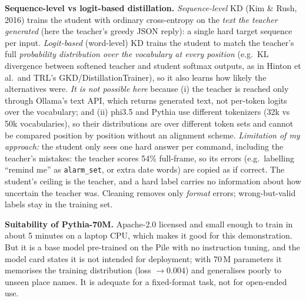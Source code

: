 \documentclass[10pt,a4paper]{article}
\newcommand{\code}[1]{\texttt{\small #1}}
\begin{document}
\textbf{Sequence-level vs logit-based distillation.}
\emph{Sequence-level} KD (Kim \& Rush, 2016) trains the student with ordinary cross-entropy on the
\emph{text the teacher generated} (here the teacher's greedy JSON reply): a single hard target sequence per input.
\emph{Logit-based} (word-level) KD trains the student to match the teacher's full \emph{probability distribution
over the vocabulary at every position} (e.g.\ KL divergence between softened teacher and student softmax outputs,
as in Hinton et al.\ and TRL's GKD/DistillationTrainer), so it also learns how likely the alternatives were.
\emph{It is not possible here} because (i) the teacher is reached only through Ollama's text API, which returns
generated text, not per-token logits over the vocabulary; and (ii) phi3.5 and Pythia use different tokenizers
(32k vs 50k vocabularies), so their distributions are over different token sets and cannot be compared position by
position without an alignment scheme. \emph{Limitation of my approach:} the student only sees one hard answer per
command, including the teacher's mistakes: the teacher scores 54\% full-frame, so its errors (e.g.\ labelling
``remind me'' as \code{alarm\_set}, or extra date words) are copied as if correct. The student's ceiling is the
teacher, and a hard label carries no information about how uncertain the teacher was. Cleaning removes only
\emph{format} errors; wrong-but-valid labels stay in the training set.

\textbf{Suitability of Pythia-70M.} Apache-2.0 licensed and small enough to train in about 5 minutes on a laptop CPU, which makes it good for this
demonstration. But it is a base model pre-trained on the Pile with no instruction tuning, and the model card states it
is not intended for deployment; with 70\,M parameters it memorises the training distribution (loss
$\to 0.004$) and generalises poorly to unseen place names. It is adequate for a fixed-format task, not for
open-ended use.

\end{document}
